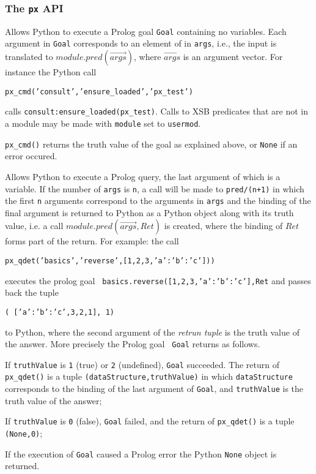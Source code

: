 \subsubsection{The {\tt px} API}

\begin{description}

%
  Allows Python to execute a Prolog goal {\tt Goal} containing no
  variables.  Each argument in {\tt Goal} corresponds to an element of
  in {\tt args}, i.e., the input is translated to
  $module.pred(\vec{args})$, where $\vec{args}$ is an argument vector.
  For instance the Python call

  {\tt px\_cmd('consult','ensure\_loaded','px\_test')}

  calls {\tt consult:ensure\_loaded(px\_test)}.  Calls to XSB
  predicates that are not in a module may be made with {\tt module}
  set to {\tt usermod}.

  {\tt px\_cmd()} returns the truth value of the goal as explained
  above, or {\tt None} if an error occured.
  
%
  Allows Python to execute a Prolog query, the last argument of which
  is a variable.  If the number of {\tt args} is {\tt n}, a call will
  be made to {\tt pred/(n+1)} in which the first {\tt n} arguments
  correspond to the arguments in {\tt args} and the binding of the
  final argument is returned to Python as a Python object along with
  its truth value, i.e. a call $module.pred(\vec{args},Ret)$ is
  created, where the binding of $Ret$ forms part of the return.  For
  example: the call

  {\tt px\_qdet('basics','reverse',[1,2,3,{'a':{'b':'c'}}]))}

  \noindent
  executes the prolog goal {\tt
    basics.reverse([1,2,3,{'a':{'b':'c'}}],Ret} and passes back the tuple

  {\tt ( [{'a':{'b':'c'}},3,2,1], 1)}

  \noindent
  to Python, where the second argument of the {\em retrun tuple} is
  the truth value of the answer.  More precisely the Prolog goal {\tt
    Goal} returns as follows.

  \bi
  \item If {\tt truthValue} is {\tt 1} (true) or {\tt 2} (undefined),
    {\tt Goal} succeeded.  The return of {\tt px\_qdet()} is a tuple
    {\tt (dataStructure,truthValue)} in which {\tt dataStructure}
    corresponds to the binding of the last argument of {\tt Goal}, and
    {\tt truthValue} is the truth value of the answer;
   \item If {\tt truthValue} is {\tt 0} (false), {\tt Goal} failed,
     and the return of {\tt px\_qdet()} is a tuple {\tt (None,0)};
   \item If the execution of {\tt Goal} caused a Prolog error the
     Python {\tt None} object is returned.
     \ei


\end{description}
